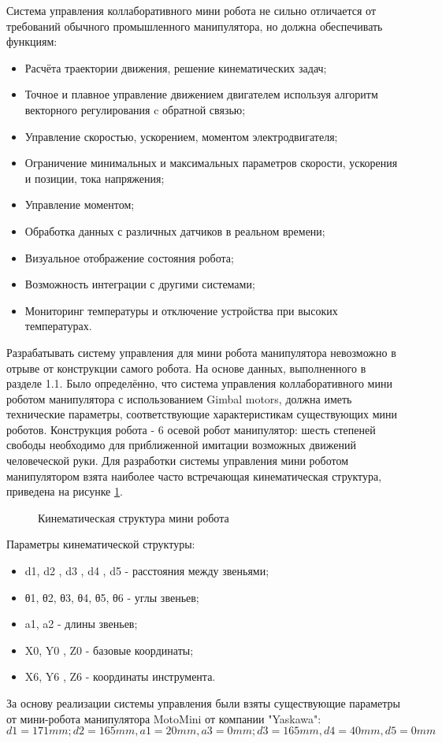 Система управления коллаборативного мини робота не сильно отличается от требований обычного промышленного манипулятора, но должна обеспечивать функциям:
\begin{itemize}
	\item Расчёта траектории движения, решение кинематических задач;
	\item Точное и плавное управление движением двигателем используя алгоритм векторного регулирования c обратной связью;
	\item Управление скоростью, ускорением, моментом электродвигателя;
	\item Ограничение минимальных и максимальных параметров скорости, ускорения и позиции, тока напряжения;
	\item Управление моментом;
	\item Обработка данных с различных датчиков в реальном времени;
	\item Визуальное отображение состояния робота;
	\item Возможность интеграции с другими системами;
	\item Мониторинг температуры и отключение устройства при высоких температурах.
\end{itemize}

Разрабатывать систему управления для мини робота манипулятора невозможно в отрыве от конструкции самого робота. На основе данных, выполненного в разделе 1.1. Было определённо, что система управления коллаборативного мини роботом манипулятора с использованием Gimbal motors, должна иметь технические параметры, соответствующие характеристикам существующих мини роботов. Конструкция робота - 6 осевой робот манипулятор: шесть степеней свободы необходимо для приближенной имитации возможных движений человеческой руки. Для разработки системы управления мини роботом манипулятором взята наиболее часто встречающая кинематическая структура, приведена на рисунке \ref{Kin}.


\begin{figure}[H]
	\centering
	
	\caption{Кинематическая структура мини робота}
	\label{Kin}
\end{figure}

Параметры кинематической структуры:

\begin{itemize}
	\item d1, d2 , d3 , d4 , d5 - расстояния между звеньями;
	\item θ1, θ2, θ3, θ4, θ5, θ6 - углы звеньев;
	\item a1, a2 - длины звеньев;
	\item X0, Y0 , Z0 - базовые координаты;
	\item X6, Y6 , Z6 - координаты инструмента.
\end{itemize}
За основу реализации системы управления были взяты существующие параметры от мини-робота манипулятора MotoMini от компании "Yaskawa":
$$ d1 = 171mm; d2 = 165mm, a1 = 20mm, 
a3 = 0mm; d3 = 165mm, d4 = 40mm, d5 = 0mm $$

